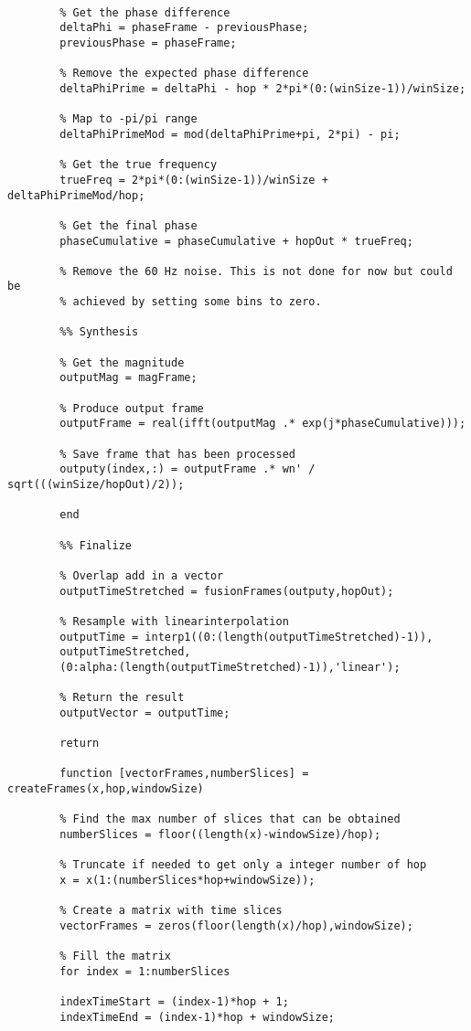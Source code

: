 \begin{lstlisting}[caption={Code: "pitchshifting.m":Código Matlab da função auxiliar responsável pelo pitch-shifter},label={codigo02}]
		%% Processing    
		
		% Get the phase difference
		deltaPhi = phaseFrame - previousPhase;
		previousPhase = phaseFrame;
		
		% Remove the expected phase difference
		deltaPhiPrime = deltaPhi - hop * 2*pi*(0:(winSize-1))/winSize;
		
		% Map to -pi/pi range
		deltaPhiPrimeMod = mod(deltaPhiPrime+pi, 2*pi) - pi;
		
		% Get the true frequency
		trueFreq = 2*pi*(0:(winSize-1))/winSize + deltaPhiPrimeMod/hop;
		
		% Get the final phase
		phaseCumulative = phaseCumulative + hopOut * trueFreq;    
		
		% Remove the 60 Hz noise. This is not done for now but could be
		% achieved by setting some bins to zero.
		
		%% Synthesis    
		
		% Get the magnitude
		outputMag = magFrame;
		
		% Produce output frame
		outputFrame = real(ifft(outputMag .* exp(j*phaseCumulative)));
		
		% Save frame that has been processed
		outputy(index,:) = outputFrame .* wn' / sqrt(((winSize/hopOut)/2));
		
		end
		
		%% Finalize
		
		% Overlap add in a vector
		outputTimeStretched = fusionFrames(outputy,hopOut);
		
		% Resample with linearinterpolation
		outputTime = interp1((0:(length(outputTimeStretched)-1)),
		outputTimeStretched,
		(0:alpha:(length(outputTimeStretched)-1)),'linear');
		
		% Return the result
		outputVector = outputTime;
		
		return
		
		function [vectorFrames,numberSlices] = createFrames(x,hop,windowSize)
		
		% Find the max number of slices that can be obtained
		numberSlices = floor((length(x)-windowSize)/hop);
		
		% Truncate if needed to get only a integer number of hop
		x = x(1:(numberSlices*hop+windowSize));
		
		% Create a matrix with time slices
		vectorFrames = zeros(floor(length(x)/hop),windowSize);
		
		% Fill the matrix
		for index = 1:numberSlices
		
		indexTimeStart = (index-1)*hop + 1;
		indexTimeEnd = (index-1)*hop + windowSize;
		

\end{lstlisting}

